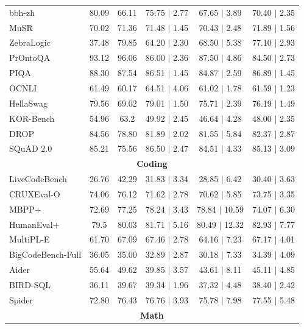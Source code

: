 \begin{table}[htbp]
{\begin{tabular}{lcc|ccc}
bbh-zh & 80.09 & 66.11 & 75.75 $\mid$ 2.77 & 67.65 $\mid$ 3.89 &  70.40 $\mid$ 2.35 \\
MuSR & 70.02 & 71.36 & 71.48 $\mid$ 1.45 & 70.43 $\mid$ 2.48 &  71.89 $\mid$ 1.56 \\
ZebraLogic & 37.48 & 79.85 & 64.20 $\mid$ 2.30 & 68.50 $\mid$ 5.38 &  77.10 $\mid$ 2.93 \\
PrOntoQA & 93.12 & 96.06 & 86.00 $\mid$ 2.36 & 87.50 $\mid$ 4.86 &  84.50 $\mid$ 2.73 \\
PIQA & 88.30 & 87.54 & 86.51 $\mid$ 1.45 & 84.87 $\mid$ 2.59 &  86.89 $\mid$ 1.45 \\
OCNLI & 61.49 & 60.17 & 64.51 $\mid$ 4.06 & 61.02 $\mid$ 1.78 &  61.59 $\mid$ 1.23 \\
HellaSwag & 79.56 & 69.02 & 79.01 $\mid$ 1.50 & 75.71 $\mid$ 2.39 &  76.19 $\mid$ 1.49 \\
KOR-Bench & 54.96 & 63.2 & 49.92 $\mid$ 2.45 & 46.64 $\mid$ 4.28 &  48.00 $\mid$ 2.35 \\
DROP & 84.56 & 78.80 & 81.89 $\mid$ 2.02 & 81.55 $\mid$ 5.84 &  82.37 $\mid$ 2.87 \\
SQuAD 2.0 & 85.21 & 75.56 & 86.50 $\mid$ 2.47 & 84.51 $\mid$ 4.33 &  85.13 $\mid$ 3.09 \\
\midrule
\multicolumn{6}{c}{\textbf{Coding}} \\
\midrule
LiveCodeBench & 26.76 & 42.29 & 31.83 $\mid$ 3.34 & 28.85 $\mid$ 6.42 &  30.40 $\mid$ 3.63 \\
CRUXEval-O & 74.06 & 76.12 & 71.62 $\mid$ 2.78 & 70.62 $\mid$ 5.85 &  73.75 $\mid$ 3.35 \\
MBPP+ & 72.69 & 77.25 & 78.24 $\mid$ 3.43 & 78.84 $\mid$ 10.59 &  74.07 $\mid$ 6.30 \\
HumanEval+ & 79.5 & 80.03 & 81.71 $\mid$ 5.16 & 80.49 $\mid$ 12.32 &  82.93 $\mid$ 7.77 \\
MultiPL-E & 61.70 & 67.09 & 67.46 $\mid$ 2.78 & 64.16 $\mid$ 7.23 &  67.17 $\mid$ 4.01 \\
BigCodeBench-Full & 36.05 & 35.00 & 32.89 $\mid$ 2.87 & 30.18 $\mid$ 7.33 &  34.39 $\mid$ 4.09 \\
Aider & 55.64 & 49.62 & 39.85 $\mid$ 3.57 & 43.61 $\mid$ 8.11 &  45.11 $\mid$ 4.85 \\
BIRD-SQL & 36.11 & 39.67 & 39.34 $\mid$ 1.96 & 37.32 $\mid$ 4.48 &  38.40 $\mid$ 2.42 \\
Spider & 72.80 & 76.43 & 76.76 $\mid$ 3.93 & 75.78 $\mid$ 7.98 &  77.55 $\mid$ 5.48 \\
\midrule
\multicolumn{6}{c}{\textbf{Math}} \\

\end{tabular}}
\end{table}
